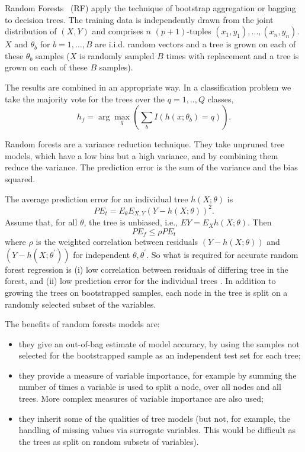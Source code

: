 \documentclass[10pt,a4paper]{article}  %
\begin{document}
Random Forests~\cite{Breiman2001} (RF) apply the technique of bootstrap aggregation or bagging to decision trees.  The training
data is independently drawn from the joint distribution of $(X,Y)$ and comprises $n$ $(p+1)$-tuples $(x_1,y_1),\ldots, (x_n,y_n)$.
$X$ and $\theta_b$ for $b=1,\ldots,B$ are i.i.d. random vectors and a tree is grown on each of these $\theta_b$  samples 
($X$ is randomly sampled $B$ times with replacement and a tree is grown on each of these $B$ samples). 

The results are combined in an appropriate way. In a classification problem we take the majority vote for the trees over
the $q=1,..,Q$ classes,
\begin{equation*}
{{h_f}}=  \arg \max_q \left(\sum_b I(h(x;\theta_b)=q)\right).
\end{equation*}

Random forests are a variance reduction technique. They take unpruned tree models, which have a low bias but a high
variance, and by combining them reduce the variance. The prediction error is the sum of the variance and the bias
squared.

The average prediction error for an individual tree $h(X; \theta)$ is
\begin{equation}
PE_t = E_\theta E_{X,Y} (Y-h(X; \theta))^2.
\end{equation}
Assume that, for all  $\theta$, the tree is unbiased, i.e., $EY= E_X h(X; \theta)$. Then
\begin{equation}
PE_f \leq \rho PE_t
\end{equation}
where $\rho$ is the weighted correlation between residuals $(Y-h(X;\theta))$ and $(Y-h(X;\theta^\prime))$ for independent $\theta,
\theta^\prime$.  
So what is required for  accurate random forest regression is (i) low correlation between residuals of differing tree in
the forest, and (ii) low prediction error for the individual trees \cite{Segal.2004}. In addition to growing the trees
on  bootstrapped samples, each node in the tree is split on a randomly selected subset of the variables.

The benefits of random forests models are:
  \begin{itemize}
  \item they give an out-of-bag estimate of model accuracy, by using the samples not selected for the bootstrapped sample
    as an independent test set for each tree;
  \item they provide a measure of variable importance, for example by summing the number of times a variable is used to
    split a node, over all nodes and all trees. More complex measures of variable importance are also used;
  \item they inherit some of the qualities of tree models (but not, for example, the handling of missing values via surrogate
    variables. This would be difficult as the trees as split on random subsets of variables).
  \end{itemize}
\end{document}
